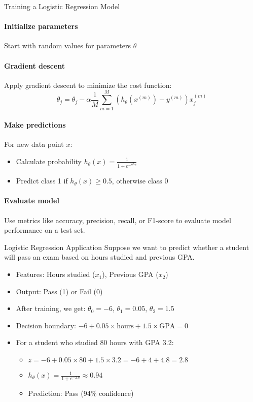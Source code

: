 \begin{KR}{Training a Logistic Regression Model}\\
\paragraph{Initialize parameters}
Start with random values for parameters $\theta$

\paragraph{Gradient descent}
Apply gradient descent to minimize the cost function:
\[\theta_j = \theta_j - \alpha \frac{1}{M}\sum_{m=1}^{M}(h_\theta(x^{(m)}) - y^{(m)})x^{(m)}_j\]

\paragraph{Make predictions}
For new data point $x$:
\begin{itemize}
    \item Calculate probability $h_\theta(x) = \frac{1}{1 + e^{-\theta^T x}}$
    \item Predict class 1 if $h_\theta(x) \geq 0.5$, otherwise class 0
\end{itemize}

\paragraph{Evaluate model}
Use metrics like accuracy, precision, recall, or F1-score to evaluate model performance on a test set.
\end{KR}

\begin{example}{Logistic Regression Application}
Suppose we want to predict whether a student will pass an exam based on hours studied and previous GPA.
\begin{itemize}
    \item Features: Hours studied ($x_1$), Previous GPA ($x_2$)
    \item Output: Pass (1) or Fail (0)
    \item After training, we get: $\theta_0 = -6$, $\theta_1 = 0.05$, $\theta_2 = 1.5$
    \item Decision boundary: $-6 + 0.05 \times \text{hours} + 1.5 \times \text{GPA} = 0$
    \item For a student who studied 80 hours with GPA 3.2:
    \begin{itemize}
        \item $z = -6 + 0.05 \times 80 + 1.5 \times 3.2 = -6 + 4 + 4.8 = 2.8$
        \item $h_\theta(x) = \frac{1}{1 + e^{-2.8}} \approx 0.94$
        \item Prediction: Pass (94\% confidence)
    \end{itemize}
\end{itemize}
\end{example}

